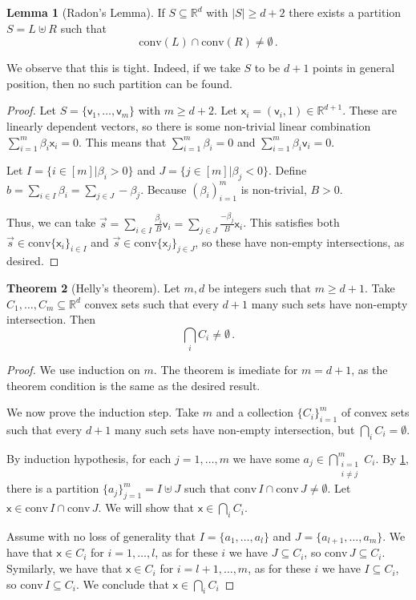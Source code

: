\documentclass[12pt]{amsart}
\theoremstyle{definition}
\newtheorem{thm}{Theorem}[section]
\newtheorem{lm}[thm]{Lemma}
\newcommand{\R}{\mathbb{R}}
\newcommand{\vv}{\mathsf{v}}
\newcommand{\vx}{\mathsf{x}}
\newcommand{\conv}{\mathrm{conv}}
\begin{document}
\begin{lm}[Radon's Lemma]\label{lm:radon}
If $S\subseteq \R^d$ with $|S| \geq d+2$ there exists a partition $S = L \uplus R$ such that $$\conv (L) \cap \conv (R) \neq \emptyset \, .$$
\end{lm}

We observe that this is tight.
Indeed, if we take $S$ to be $d+1$ points in general position, then no such partition can be found.

\begin{proof}
Let $S = \{\vv_1, \ldots, \vv_m \}$ with $m\geq d+2$.
Let $\vx_i = (\vv_i, 1)\in \R^{d+1}$.
These are linearly dependent vectors, so there is some non-trivial linear combination $\sum_{i=1}^m \beta_i \vx_i = 0$.
This means that $\sum_{i=1}^m \beta_i = 0$ and $\sum_{i=1}^m \beta_i \vv_i = 0$.

Let $I = \{i\in [m] | \beta_i  > 0 \}$ and $J = \{j\in [m] | \beta_j < 0 \}$.
Define $b = \sum_{i\in I} \beta_i = \sum_{j\in J} - \beta_j$.
Because $(\beta_i)_{i=1}^m$ is non-trivial, $B>0$.

Thus, we can take $\vec{s} = \sum_{i\in I} \frac{\beta_i}{B} \vv_i = \sum_{j\in J}\frac{-\beta_j}{B}\vx_i$.
This satisfies both $\vec{s} \in \conv \{\vx_i\}_{i\in I}$ and $\vec{s} \in \conv \{\vx_j\}_{j\in J}$, so these have non-empty intersections, as desired.
\end{proof}


\begin{thm}[Helly's theorem]
Let $m, d $ be integers such that $m \geq d+1$.
Take $C_1, \ldots , C_m \subseteq \R^d$ convex sets such that every $d+1$ many such sets have non-empty intersection.
Then 
$$\bigcap_i C_i \neq \emptyset \, . $$
\end{thm}

\begin{proof}
We use induction on $m$.
The theorem is imediate for $m = d+1$, as the theorem condition is the same as the desired result.

We now prove the induction step.
Take $m$ and a collection $\{C_i\}_{i=1}^m$ of convex sets such that every $d+1$ many such sets have non-empty intersection, but $\bigcap_i C_i = \emptyset$.

By induction hypothesis, for each $j = 1, \ldots, m$ we have some $a_j \in \bigcap_{\substack{i=1 \\ i\neq j}}^m C_i$.
By \cref{lm:radon}, there is a partition $\{a_j\}_{j=1}^m = I \uplus J$ such that $\conv \, I \cap \conv \, J \neq \emptyset$.
Let $\vx \in \conv \, I \cap \conv \, J $.
We will show that $\vx \in \bigcap_i C_i$.

Assume with no loss of generality that $I = \{a_1, \ldots, a_l\} $ and $J= \{ a_{l+1} , \ldots, a_m\}$.
We have that $\vx \in C_i$ for $i = 1, \ldots, l$, as for these $i$ we have $J \subseteq  C_i$, so $\conv \, J \subseteq C_i$.
Symilarly, we have that $\vx \in C_i$ for $i = l+1, \ldots, m$, as for these $i$ we have $I \subseteq  C_i$, so $\conv \, I \subseteq C_i$.
We conclude that $\vx \in \bigcap_i C_i$
\end{proof}
\end{document}
